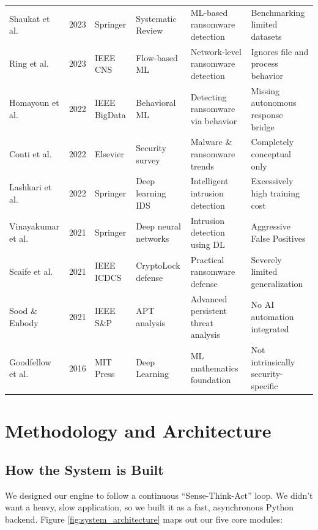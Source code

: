 \documentclass[conference]{IEEEtran}
\begin{document}
\begin{table}[t]
\begin{tabular}{l c p{2.2cm} p{2.8cm} p{3.8cm} p{3.8cm}}
Shaukat et al. \cite{shaukat2023systematic} & 2023 & Springer & Systematic Review & ML-based ransomware detection & Benchmarking limited datasets \\
Ring et al. \cite{ring2023flow} & 2023 & IEEE CNS & Flow-based ML & Network-level ransomware detection & Ignores file and process behavior \\
Homayoun et al. \cite{homayoun2022behavioral} & 2022 & IEEE BigData & Behavioral ML & Detecting ransomware via behavior & Missing autonomous response bridge \\
Conti et al. \cite{conti2022security} & 2022 & Elsevier & Security survey & Malware \& ransomware trends & Completely conceptual only \\
Lashkari et al. \cite{lashkari2022deep} & 2022 & Springer & Deep learning IDS & Intelligent intrusion detection & Excessively high training cost \\
Vinayakumar et al. \cite{vinayakumar2021deep} & 2021 & Springer & Deep neural networks & Intrusion detection using DL & Aggressive False Positives \\
Scaife et al. \cite{scaife2021cryptolock} & 2021 & IEEE ICDCS & CryptoLock defense & Practical ransomware defense & Severely limited generalization \\
Sood \& Enbody \cite{sood2021apt} & 2021 & IEEE S\&P & APT analysis & Advanced persistent threat analysis & No AI automation integrated \\
Goodfellow et al. \cite{goodfellow2016deep} & 2016 & MIT Press & Deep Learning & ML mathematics foundation & Not intrinsically security-specific \\
\bottomrule
\end{tabular}
\vspace{-2mm}
\end{table}

\section{Methodology and Architecture}

\subsection{How the System is Built}

We designed our engine to follow a continuous ``Sense-Think-Act'' loop. We didn't want a heavy, slow application, so we built it as a fast, asynchronous Python backend. Figure \ref{fig:system_architecture} maps out our five core modules:
\end{document}
